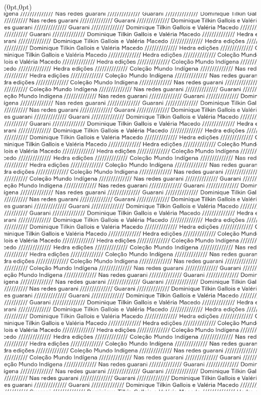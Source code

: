 \thispagestyle{empty}

\begin{textblock*}{2.625in}(0pt,0pt)%
\vspace*{-2.5cm}
\hspace*{-2.65cm}\includegraphics[width=138mm]{./img/ABERTURA.png}  
\end{textblock*}

\pagebreak
\blankpage



